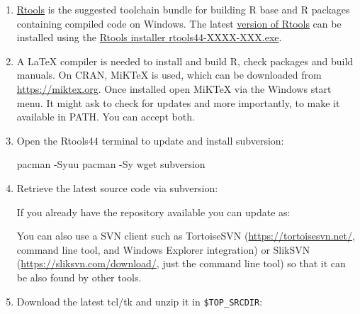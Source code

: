 \documentclass[
]{book}
\newenvironment{Shaded}{\begin{snugshade}}{\end{snugshade}}
\newcommand{\AttributeTok}[1]{\textcolor[rgb]{0.13,0.29,0.53}{#1}}
\newcommand{\BuiltInTok}[1]{#1}
\newcommand{\ExtensionTok}[1]{#1}
\newcommand{\FunctionTok}[1]{\textcolor[rgb]{0.13,0.29,0.53}{\textbf{#1}}}
\newcommand{\NormalTok}[1]{#1}
\newcommand{\OperatorTok}[1]{\textcolor[rgb]{0.81,0.36,0.00}{\textbf{#1}}}
\newcommand{\StringTok}[1]{\textcolor[rgb]{0.31,0.60,0.02}{#1}}
\newcommand{\VariableTok}[1]{\textcolor[rgb]{0.00,0.00,0.00}{#1}}
\begin{document}
\begin{enumerate}
\def\labelenumi{\arabic{enumi}.}
\item
  \href{https://cran.r-project.org/bin/windows/Rtools/}{Rtools} is the suggested toolchain bundle for building R base and R packages containing compiled code on Windows.
  The latest \href{https://cran.r-project.org/bin/windows/Rtools/rtools44/rtools.html}{version of Rtools} can be installed using the \href{https://cran.r-project.org/bin/windows/Rtools/rtools44/files/}{Rtools installer rtools44-XXXX-XXX.exe}.
\item
  A LaTeX compiler is needed to install and build R, check packages and build manuals.
  On CRAN, MiKTeX is used, which can be downloaded from \url{https://miktex.org}.
  Once installed open MiKTeX via the Windows start menu.
  It might ask to check for updates and more importantly, to make it available in PATH. You can accept both.
\item
  Open the Rtools44 terminal to update and install subversion:

\begin{Shaded}
\begin{Highlighting}[]
\ExtensionTok{pacman} \AttributeTok{{-}Syuu}
\ExtensionTok{pacman} \AttributeTok{{-}Sy}\NormalTok{ wget subversion}
\end{Highlighting}
\end{Shaded}
\item
  Retrieve the latest source code via subversion:

\begin{Shaded}
\end{Shaded}

  If you already have the repository available you can update as:

\begin{Shaded}
\end{Shaded}

  You can also use a SVN client such as TortoiseSVN (\url{https://tortoisesvn.net/}, command line tool, and Windows Explorer integration) or SlikSVN (\url{https://sliksvn.com/download/}, just the command line tool) so that it can be also found by other tools.
\item
  Download the latest tcl/tk and unzip it in \texttt{\$TOP\_SRCDIR}:


\end{enumerate}
\end{document}
